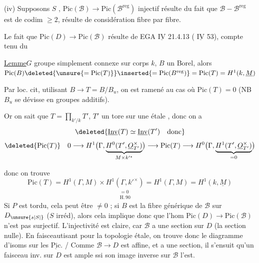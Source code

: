 (iv) Supposons  $S$ ,   $\mathrm{Pic}(\mathscr B)\longrightarrow\mathrm{Pic}(\mathscr B^{\mathrm{reg}})$ injectif résulte  du fait que $\mathscr B-\mathscr B^{\mathrm{reg}}$ est de codim $\geq 2$,   résulte de considération fibre par fibre.

Le fait que $\mathrm{Pic}(D)\longrightarrow\mathrm{Pic}(\mathscr B)$  résulte de EGA $\underline{\mathrm{IV}}$ 21.4.13 ( $\underline{\mathrm{IV}}$ 53), compte tenu du

\uline{Lemme}\quad $G$ groupe  simplement connexe sur corps $k$, $B$ un Borel, alors $\mathrm{Pic}(B)\deleted{\unsure{=\mathrm{Pic}(T)}}\inserted{=\mathrm{Pic}(B^{\mathrm{reg}})}=\mathrm{Pic}(T)=H^1(k,\underline M)$  

Par loc. cit, utilisant  $B\longrightarrow T=B/B_u$, on est ramené au cas où $\mathrm{Pic}(T)=0$ (NB $B_u$ se dévisse en groupes additifs).


Or on sait que $T=\prod_{k'/k} T'$, $T'$ un tore sur une  étale , donc on a 
\[
\deleted{\underline{\mathrm{Inv}}(T)\simeq\underline{\mathrm{Inv}}(T')\quad\text{donc}}
\]
\[
\deleted{\mathrm{Pic}(T)}\quad
0\longrightarrow H^1\bigl(\Gamma,\underbrace{H^0(T',\underline O_{T'}^{\times})}_{M\times k'^{*}}\bigr)
\longrightarrow\mathrm{Pic}(T)\longrightarrow H^0\bigl(\Gamma,\underbrace{H^1(T',\underline O_{T'}^{\times})}_{=0}\bigr)
\]

donc on trouve
\[
\mathrm{Pic}(T)=H^1(\Gamma,M)\times\underset{\substack{=0\\\mathrm{H.}\,90}}{H^1(\Gamma,k'^{\times})}=H^1(\Gamma,M)=H^1(k,\underline M)
\]
Si $P$ est tordu, cela peut être $\ne 0$ ; si $B$ est la fibre générique de $\mathscr B$ sur $D_{\unsure{s|S|{}}}$ ($S$ irréd), alors cela implique donc que l'hom $\mathrm{Pic}(D)\longrightarrow\mathrm{Pic}(\mathscr B)$ n'est pas surjectif. L'injectivité est claire, car $\mathscr B$ a une section sur $D$ (la section nulle). En faisceautisant pour la topologie étale, on trouve donc le diagramme d'isoms sur les $\underline{\mathrm{Pic}}$. / Comme $\mathscr B\longrightarrow D$ est affine, et a une section, il s'ensuit qu'un faisceau inv. sur $D$ est ample ssi son image inverse sur $\mathscr B$ l'est.

